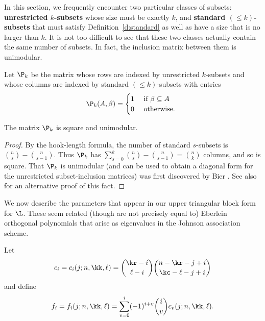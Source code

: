 In this section, we frequently encounter two particular classes of subsets:  {\bf unrestricted $k$-subsets} whose size must be exactly $k$, and {\bf standard $(\leq k)$-subsets} that must satisfy Definition~\ref{d:standard} as well as have a size that is no larger than $k$.  It is not too difficult to see that these two classes actually contain the same number of subsets.  In fact, the inclusion matrix between them is unimodular.

\begin{definition}\label{d:p}
Let $\P_k$ be the matrix whose rows are indexed by unrestricted $k$-subsets and whose columns are indexed by standard $(\leq k)$-subsets with entries
\[ \P_k(A, \beta) = \begin{cases} 1 & \text{ if $\beta \subseteq A$ } \\ 0 & \text{ otherwise. } \end{cases} \]
\end{definition}

\begin{theorem}
The matrix $\P_k$ is square and unimodular.
\end{theorem}
\begin{proof}
By the hook-length formula, the number of standard $s$-subsets is $\binom{n}{s} - \binom{n}{s-1}$.  Thus $\P_k$ has $\sum_{s=0}^{k} \binom{n}{s} - \binom{n}{s-1} = \binom{n}{k}$ columns, and so is square.  That $\P_k$ is unimodular (and can be used to obtain a diagonal form for the unrestricted subset-inclusion matrices) was first discovered by Bier \cite{bier}.  See also \cite[Theorem 8]{resilience} for an alternative proof of this fact.
\end{proof}

We now describe the parameters that appear in our upper triangular block form for $\L$.  These seem related (though are not precisely equal to) Eberlein orthogonal polynomials that arise as eigenvalues in the Johnson association scheme.

\begin{definition}\label{d:cf}
    Let 
    \[ c_i = c_i(j; n, \kk, \ell) = \binom{\kr-i}{\ell-i}\binom{n-\kr-j+i}{\kc-\ell-j+i} \]
    and define
    \[ f_i = f_i(j; n, \kk, \ell) = \sum_{v=0}^i (-1)^{i+v} \binom{i}{v} c_v(j; n, \kk, \ell). \]
\end{definition}

